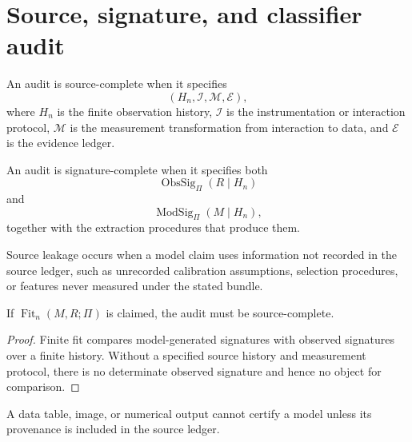\section{Source, signature, and classifier audit}
\label{sec:source-signature-classifier-audit}

\begin{definition}
\label{def:source-complete-audit}
An audit is source-complete when it specifies
$$
(H_n,\mathcal I,\mathcal M,\mathcal E),
$$
where $H_n$ is the finite observation history, $\mathcal I$ is the instrumentation or interaction protocol, $\mathcal M$ is the measurement transformation from interaction to data, and $\mathcal E$ is the evidence ledger.
\end{definition}

\begin{definition}
\label{def:signature-complete-audit}
An audit is signature-complete when it specifies both
$$
\operatorname{ObsSig}_{\Pi}(R\mid H_n)
$$
and
$$
\operatorname{ModSig}_{\Pi}(M\mid H_n),
$$
together with the extraction procedures that produce them.
\end{definition}

\begin{definition}
\label{def:source-leakage}
Source leakage occurs when a model claim uses information not recorded in the source ledger, such as unrecorded calibration assumptions, selection procedures, or features never measured under the stated bundle.
\end{definition}

\begin{theorem}
\label{thm:source-completeness-necessary-fit}
If $\operatorname{Fit}_n(M,R;\Pi)$ is claimed, the audit must be source-complete.
\end{theorem}

\begin{proof}
Finite fit compares model-generated signatures with observed signatures over a finite history. Without a specified source history and measurement protocol, there is no determinate observed signature and hence no object for comparison.
\end{proof}

\begin{corollary}
\label{cor:data-without-provenance-cannot-certify}
A data table, image, or numerical output cannot certify a model unless its provenance is included in the source ledger.
\end{corollary}

